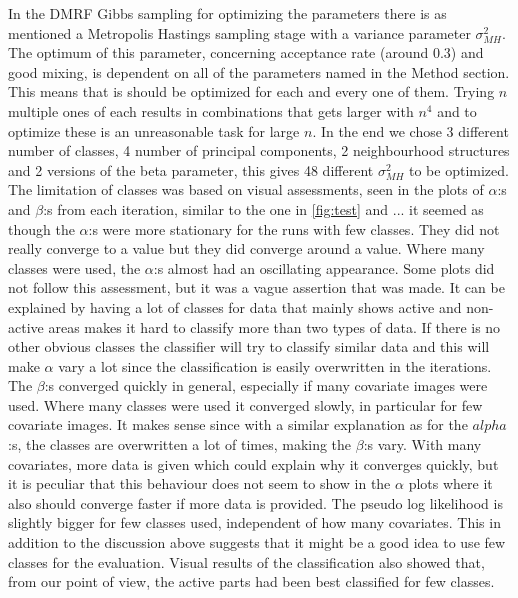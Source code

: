 \documentclass[a4paper,english]{article}
\begin{document}
In the DMRF Gibbs sampling for optimizing the parameters there is as mentioned a Metropolis Hastings sampling stage with a variance parameter  $\sigma_{MH}^2$.
The optimum of this parameter, concerning acceptance rate (around $0.3$) and good mixing, is dependent on all of the parameters named in the Method section. %
This means that is should be optimized for each and every one of them.
Trying $n$ multiple ones of each results in combinations that gets larger with $n^4$ and to optimize these is an unreasonable task for large $n$.
In the end we chose 3 different number of classes, 4 number of principal components, 2 neighbourhood structures and 2 versions of the beta parameter, this gives 48 different $\sigma_{MH}^2$ to be optimized. The limitation of classes was based on visual assessments, seen in the plots of $\alpha$:s and $\beta$:s from each iteration, similar to the one in \ref{fig:test} and ... it seemed as though the $\alpha$:s were more stationary for the runs with few classes. They did not really converge to a value but they did converge around a value. Where many classes were used, the $\alpha$:s almost had an oscillating appearance. Some plots did not follow this assessment, but it was a vague assertion that was made.
It can be explained by having a lot of classes for data that mainly shows active and non-active areas makes it hard to classify more than two types of data. If there is no other obvious classes the classifier will try to classify similar data and this will make $\alpha$ vary a lot since the classification is easily overwritten in the iterations. The $\beta$:s converged quickly in general, especially if many covariate images were used. Where many classes were used it converged slowly, in particular for few covariate images. It makes sense since with a similar explanation as for the $alpha$:s, the classes are overwritten a lot of times, making the $\beta$:s vary. With many covariates, more data is given which could explain why it converges quickly, but it is peculiar that this behaviour does not seem to show in the $\alpha$ plots where it also should converge faster if more data is provided. The pseudo log likelihood is slightly bigger for few classes used, independent of how many covariates. This in addition to the discussion above suggests that it might be a good idea to use few classes for the evaluation. Visual results of the classification also showed that, from our point of view, the active parts had been best classified for few classes.
\end{document}
